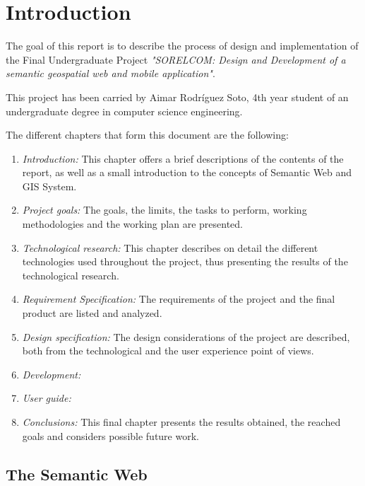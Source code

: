 \chapter{Introduction}\label{cha:intro}

The goal of this report is to describe the process of design and implementation of the Final Undergraduate Project \textit{"SORELCOM: Design and Development of a semantic geospatial web and mobile application"}.

This project has been carried by Aimar Rodr\'iguez Soto, 4th year student of an undergraduate degree in computer science engineering.

The different chapters that form this document are the following:

\begin{enumerate}
	\item \textit{Introduction:} This chapter offers a brief descriptions of the contents of the report, as well as a small introduction to the concepts of Semantic Web and GIS System.
	
	\item \textit{Project goals:} The goals, the limits, the tasks to perform, working methodologies and the working plan are presented.
	
	\item \textit{Technological research:} This chapter describes on detail the different technologies used throughout the project, thus presenting the results of the technological research.
	
	\item \textit{Requirement Specification:} The requirements of the project and the final product are listed and analyzed.
	
	\item \textit{Design specification:} The design considerations of the project are described, both from the technological and the user experience point of views.
	
	\item \textit{Development:}
	
	\item \textit{User guide:} 
	
	\item \textit{Conclusions:} This final chapter presents the results obtained, the reached goals and considers possible future work.
\end{enumerate}

\section{The Semantic Web}

